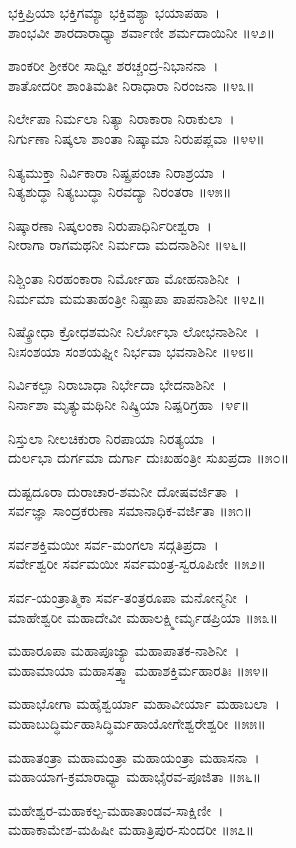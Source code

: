 ಭಕ್ತಿಪ್ರಿಯಾ ಭಕ್ತಿಗಮ್ಯಾ ಭಕ್ತಿವಶ್ಯಾ ಭಯಾಪಹಾ~।\\
ಶಾಂಭವೀ ಶಾರದಾರಾಧ್ಯಾ ಶರ್ವಾಣೀ ಶರ್ಮದಾಯಿನೀ ॥೪೨॥

ಶಾಂಕರೀ ಶ್ರೀಕರೀ ಸಾಧ್ವೀ ಶರಚ್ಚಂದ್ರ-ನಿಭಾನನಾ~।\\
ಶಾತೋದರೀ ಶಾಂತಿಮತೀ ನಿರಾಧಾರಾ ನಿರಂಜನಾ ॥೪೩॥

ನಿರ್ಲೇಪಾ ನಿರ್ಮಲಾ ನಿತ್ಯಾ ನಿರಾಕಾರಾ ನಿರಾಕುಲಾ~।\\
ನಿರ್ಗುಣಾ ನಿಷ್ಕಲಾ ಶಾಂತಾ ನಿಷ್ಕಾಮಾ ನಿರುಪಪ್ಲವಾ ॥೪೪॥

ನಿತ್ಯಮುಕ್ತಾ ನಿರ್ವಿಕಾರಾ ನಿಷ್ಪ್ರಪಂಚಾ ನಿರಾಶ್ರಯಾ~।\\
ನಿತ್ಯಶುದ್ಧಾ ನಿತ್ಯಬುದ್ಧಾ ನಿರವದ್ಯಾ ನಿರಂತರಾ ॥೪೫॥

ನಿಷ್ಕಾರಣಾ ನಿಷ್ಕಲಂಕಾ ನಿರುಪಾಧಿರ್ನಿರೀಶ್ವರಾ~।\\
ನೀರಾಗಾ ರಾಗಮಥನೀ ನಿರ್ಮದಾ ಮದನಾಶಿನೀ ॥೪೬॥

ನಿಶ್ಚಿಂತಾ ನಿರಹಂಕಾರಾ ನಿರ್ಮೋಹಾ ಮೋಹನಾಶಿನೀ~।\\
ನಿರ್ಮಮಾ ಮಮತಾಹಂತ್ರೀ ನಿಷ್ಪಾಪಾ ಪಾಪನಾಶಿನೀ ॥೪೭॥

ನಿಷ್ಕ್ರೋಧಾ ಕ್ರೋಧಶಮನೀ ನಿರ್ಲೋಭಾ ಲೋಭನಾಶಿನೀ~।\\
ನಿಃಸಂಶಯಾ ಸಂಶಯಘ್ನೀ ನಿರ್ಭವಾ ಭವನಾಶಿನೀ ॥೪೮॥

ನಿರ್ವಿಕಲ್ಪಾ ನಿರಾಬಾಧಾ ನಿರ್ಭೇದಾ ಭೇದನಾಶಿನೀ~।\\
ನಿರ್ನಾಶಾ ಮೃತ್ಯುಮಥಿನೀ ನಿಷ್ಕ್ರಿಯಾ ನಿಷ್ಪರಿಗ್ರಹಾ~।೪೯॥

ನಿಸ್ತುಲಾ ನೀಲಚಿಕುರಾ ನಿರಪಾಯಾ ನಿರತ್ಯಯಾ~।\\
ದುರ್ಲಭಾ ದುರ್ಗಮಾ ದುರ್ಗಾ ದುಃಖಹಂತ್ರೀ ಸುಖಪ್ರದಾ ॥೫೦॥

ದುಷ್ಟದೂರಾ ದುರಾಚಾರ-ಶಮನೀ ದೋಷವರ್ಜಿತಾ~।\\
ಸರ್ವಜ್ಞಾ ಸಾಂದ್ರಕರುಣಾ ಸಮಾನಾಧಿಕ-ವರ್ಜಿತಾ ॥೫೧॥

ಸರ್ವಶಕ್ತಿಮಯೀ ಸರ್ವ-ಮಂಗಲಾ  ಸದ್ಗತಿಪ್ರದಾ~।\\
ಸರ್ವೇಶ್ವರೀ ಸರ್ವಮಯೀ ಸರ್ವಮಂತ್ರ-ಸ್ವರೂಪಿಣೀ ॥೫೨॥

ಸರ್ವ-ಯಂತ್ರಾತ್ಮಿಕಾ ಸರ್ವ-ತಂತ್ರರೂಪಾ ಮನೋನ್ಮನೀ~।\\
ಮಾಹೇಶ್ವರೀ ಮಹಾದೇವೀ ಮಹಾಲಕ್ಷ್ಮೀರ್ಮೃಡಪ್ರಿಯಾ ॥೫೩॥

ಮಹಾರೂಪಾ ಮಹಾಪೂಜ್ಯಾ ಮಹಾಪಾತಕ-ನಾಶಿನೀ~।\\
ಮಹಾಮಾಯಾ ಮಹಾಸತ್ತ್ವಾ ಮಹಾಶಕ್ತಿರ್ಮಹಾರತಿಃ ॥೫೪॥

ಮಹಾಭೋಗಾ ಮಹೈಶ್ವರ್ಯಾ ಮಹಾವೀರ್ಯಾ ಮಹಾಬಲಾ~।\\
ಮಹಾಬುದ್ಧಿರ್ಮಹಾಸಿದ್ಧಿರ್ಮಹಾಯೋಗೇಶ್ವರೇಶ್ವರೀ ॥೫೫॥

ಮಹಾತಂತ್ರಾ ಮಹಾಮಂತ್ರಾ ಮಹಾಯಂತ್ರಾ ಮಹಾಸನಾ~।\\
ಮಹಾಯಾಗ-ಕ್ರಮಾರಾಧ್ಯಾ ಮಹಾಭೈರವ-ಪೂಜಿತಾ ॥೫೬॥

ಮಹೇಶ್ವರ-ಮಹಾಕಲ್ಪ-ಮಹಾತಾಂಡವ-ಸಾಕ್ಷಿಣೀ~।\\
ಮಹಾಕಾಮೇಶ-ಮಹಿಷೀ ಮಹಾತ್ರಿಪುರ-ಸುಂದರೀ ॥೫೭॥


